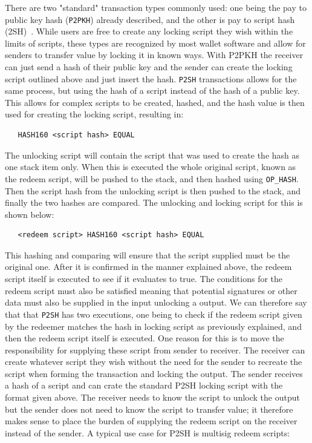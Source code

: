 There are two "standard" transaction types commonly used: one being the pay to public key hash ({\tt P2PKH}) already described, and the other is pay to script hash ({\ttP2SH})~\cite{BIP16}. While users are free to create any locking script they wish within the limits of scripts, these types are recognized by most wallet software and allow for senders to transfer value by locking it in known ways. With P2PKH the receiver can just send a hash of their public key and the sender can create the locking script outlined above and just insert the hash. {\tt P2SH} transactions allows for the same process, but using the hash of a script instead of the hash of a public key. This allows for complex scripts to be created, hashed, and the hash value is then used for creating the locking script, resulting in:

\begin{verbatim}
   HASH160 <script hash> EQUAL
\end{verbatim}

The unlocking script will contain the script that was used to create the hash as one stack item only. When this is executed the whole original script, known as the redeem script, will be pushed to the stack, and then hashed using {\tt OP\_HASH}. Then the script hash from the unlocking script is then pushed to the stack, and finally the two hashes are compared. The unlocking and locking script for this is shown below:

\begin{verbatim}
   <redeem script> HASH160 <script hash> EQUAL
\end{verbatim}

This hashing and comparing will ensure that the script supplied must be the original one. After it is confirmed in the manner explained above, the redeem script itself is executed to see if it evaluates to true. The conditions for the redeem script must also be satisfied meaning that potential signatures or other data must also be supplied in the input unlocking a output. We can therefore say that that {\tt P2SH} has two executions, one being to check if the redeem script given by the redeemer matches the hash in locking script as previously explained, and then the redeem script itself is executed.
One reason for this is to move the responsibility for supplying these script from sender to receiver. The receiver can create whatever script they wish without the need for the sender to recreate the script when forming the transaction and locking the output. The sender receives a hash of a script and can crate the standard P2SH locking script with the format given above. The receiver needs to know the script to unlock the output but the sender does not need to know the script to transfer value; it therefore makes sense to place the burden of supplying the redeem script on the receiver instead of the sender. A typical use case for P2SH is multisig redeem scripts: 

